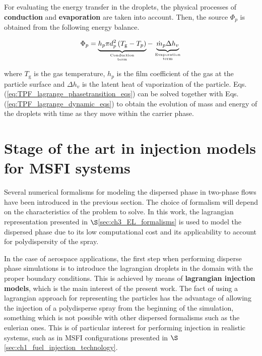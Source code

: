 For evaluating the energy transfer in the droplets, the physical processes of \textbf{conduction} and  \textbf{evaporation} are taken into account. Then, the source $\Phi_p$ is obtained from the following energy balance.

\begin{equation}
\Phi_p = \underbrace{ h_p \pi d_p^2 \left( T_\mathrm{g} - T_p \right) }_{\text{Conduction}\atop\text{term}} - \underbrace{ \dot{m}_p  \Delta h_v }_{\text{Evaporation}\atop\text{term}}
\end{equation}

where $T_\mathrm{g}$ is the gas temperature, $h_p$ is the film coefficient of the gas at the particle surface and $\Delta h_v$ is the latent heat of vaporization of the particle. Eqs. (\ref{eq:TPF_lagrange_phasetransition_eqs}) can be solved together with Eqs. (\ref{eq:TPF_lagrange_dynamic_eqs}) to obtain the evolution of mass and energy of the droplets with time as they move within the carrier phase.

\section{Stage of the art in injection models for MSFI systems}
\label{sec:ch3_state_art_lagrangian_injection}

Several numerical formalisms for modeling the dispersed phase in two-phase flows have been introduced in the previous section. The choice of formalism will depend on the characteristics of the problem to solve. In this work, the lagrangian representation presented in $\S$\ref{sec:ch3_EL_formalisms} is used to model the dispersed phase due to its low computational cost and its applicability to account for polydispersity of the spray.%

In the case of aerospace applications, the first step when performing disperse phase simulations is to introduce the lagrangian droplets in the domain with the proper boundary conditions. This is achieved by means of \textbf{lagrangian injection models}, which is the main interest of the present work. The fact of using a lagrangian approach for representing the particles has the advantage of allowing the injection of a polydisperse spray from the beginning of the simulation, something which is not possible with other dispersed formalisms such as the eulerian ones. This is of particular interest for performing injection in realistic systems, such as in MSFI configurations presented in $\S$\ref{sec:ch1_fuel_injection_technology}. 

